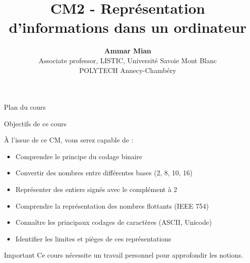 \documentclass[aspectratio=1610]{beamer}
\title[CM2 - Représentation d'informations]{CM2 - Représentation d'informations dans un ordinateur}
\date[]{}
\author[AM]{\textbf{Ammar Mian} \\ \footnotesize Associate professor, LISTIC, Université Savoie Mont Blanc \\ POLYTECH Annecy-Chambéry}
\begin{document}
\begin{frame}
\titlepage
\end{frame}

\begingroup
{}
\begin{frame}{Plan du cours}
    \tableofcontents[]
\end{frame}
\endgroup



\begin{frame}{Objectifs de ce cours}

  À l'issue de ce CM, vous serez capable de :

  \begin{itemize}
    \item Comprendre le principe du codage binaire
    \item Convertir des nombres entre différentes bases (2, 8, 10, 16)
    \item Représenter des entiers signés avec le complément à 2
    \item Comprendre la représentation des nombres flottants (IEEE 754)
    \item Connaître les principaux codages de caractères (ASCII, Unicode)
    \item Identifier les limites et pièges de ces représentations
  \end{itemize}

  \vspace{1em}

  \begin{alertblock}{Important}
    Ce cours nécessite un travail personnel pour approfondir les notions.
  \end{alertblock}

\end{frame}

\end{document}
